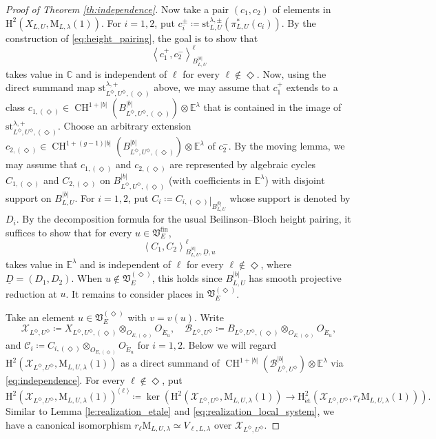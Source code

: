 \documentclass[12pt]{amsart}
\numberwithin{equation}{section}
\theoremstyle{plain}
\theoremstyle{definition}
\theoremstyle{remark}
\renewcommand{\c}[1]{\mathcal{#1}}
\renewcommand{\d}[1]{\mathbb{#1}}
\newcommand{\f}[1]{\mathfrak{#1}}
\renewcommand{\r}[1]{\mathrm{#1}}
\renewcommand{\(}{\left(}
\renewcommand{\)}{\right)}
\newcommand{\res}{\mathbin{|}}
\newcommand{\ang}[1]{\langle{#1}\rangle}
\newcommand{\ul}{\underline}
\newcommand{\cB}{\c B}
\newcommand{\cC}{\c C}
\newcommand{\cX}{\c X}
\newcommand{\dC}{\d C}
\newcommand{\dE}{\d E}
\newcommand{\fV}{\f V}
\newcommand{\rH}{\r H}
\newcommand{\rM}{\r M}
\newcommand{\llangle}{\left\langle}
\newcommand{\rrangle}{\right\rangle}
\newcommand{\et}{{\acute{\r{e}}\r{t}}}
\newcommand{\fin}{\r{fin}}
\newcommand{\st}{\r{st}}
\DeclareMathOperator{\CH}{CH}
\DeclareMathOperator{\Ker}{ker}
\begin{document}
\begin{proof}[Proof of Theorem \ref{th:independence}]
Now take a pair $(c_1,c_2)$ of elements in $\rH^2(X_{L,U},\rM_{L,\lambda}(1))$. For $i=1,2$, put $c_i^\pm\coloneqq\st_{L,U}^{\lambda,\pm}(\pi_{L,U}^*(c_i))$. By the construction of \eqref{eq:height_pairing}, the goal is to show that
\[
\llangle c_1^+,c_2^-\rrangle_{B_{L,U}^{|b|}}^\ell
\]
takes value in $\dC$ and is independent of $\ell$ for every $\ell\not\in\Diamond$. Now, using the direct summand map $\st_{L^\Diamond,U^\Diamond,(\Diamond)}^{\lambda,+}$ above, we may assume that $c_1^+$ extends to a class $c_{1,(\Diamond)}\in\CH^{1+|b|}(B_{L^\Diamond,U^\Diamond,(\Diamond)}^{|b|})\otimes\dE^\lambda$ that is contained in the image of $\st_{L^\Diamond,U^\Diamond,(\Diamond)}^{\lambda,+}$. Choose an arbitrary extension $c_{2,(\Diamond)}\in\CH^{1+(g-1)|b|}(B_{L^\Diamond,U^\Diamond,(\Diamond)}^{|b|})\otimes\dE^\lambda$ of $c_2^-$. By the moving lemma, we may assume that $c_{1,(\Diamond)}$ and $c_{2,(\Diamond)}$ are represented by algebraic cycles $C_{1,(\Diamond)}$ and $C_{2,(\Diamond)}$ on $B_{L^\Diamond,U^\Diamond,(\Diamond)}^{|b|}$ (with coefficients in $\dE^\lambda$) with disjoint support on $B_{L,U}^{|b|}$. For $i=1,2$, put $C_i\coloneqq C_{i,(\Diamond)}\res_{B_{L,U}^{|b|}}$ whose support is denoted by $D_i$. By the decomposition formula for the usual Beilinson--Bloch height pairing, it suffices to show that for every $u\in\fV_E^\fin$,
\[
\llangle C_1,C_2\rrangle_{B_{L,U}^{|b|},\ul{D},u}^\ell
\]
takes value in $\dE^\lambda$ and is independent of $\ell$ for every $\ell\not\in\Diamond$, where $\ul{D}=(D_1,D_2)$. When $u\not\in\fV_E^{(\Diamond)}$, this holds since $B_{L,U}^{|b|}$ has smooth projective reduction at $u$. It remains to consider places in $\fV_E^{(\Diamond)}$.

Take an element $u\in\fV_E^{(\Diamond)}$ with $v=v(u)$. Write
\[
\cX_{L^\Diamond,U^\Diamond}\coloneqq X_{L^\Diamond,U^\Diamond,(\Diamond)}\otimes_{O_{E,(\Diamond)}}O_{\breve{E}_u},\quad
\cB_{L^\Diamond,U^\Diamond}\coloneqq B_{L^\Diamond,U^\Diamond,(\Diamond)}\otimes_{O_{E,(\Diamond)}}O_{\breve{E}_u},
\]
and $\cC_i\coloneqq C_{i,(\Diamond)}\otimes_{O_{E,(\Diamond)}}O_{\breve{E}_u}$ for $i=1,2$. Below we will regard $\rH^2(\cX_{L^\Diamond,U^\Diamond},\rM_{L,U,\lambda}(1))$ as a direct summand of $\CH^{1+|b|}(\cB_{L^\Diamond,U^\Diamond}^{|b|})\otimes\dE^\lambda$ via \eqref{eq:independence}. For every $\ell\not\in\Diamond$, put
\[
\rH^2(\cX_{L^\Diamond,U^\Diamond},\rM_{L,U,\lambda}(1))^{\ang{\ell}}\coloneqq
\Ker\(\rH^2(\cX_{L^\Diamond,U^\Diamond},\rM_{L,U,\lambda}(1))
\to\rH^2_{\et}(\cX_{L^\Diamond,U^\Diamond},r_\ell\rM_{L,U,\lambda}(1))\).
\]
Similar to Lemma \ref{le:realization_etale} and \eqref{eq:realization_local_system}, we have a canonical isomorphism $r_\ell\rM_{L,U,\lambda}\simeq V_{\ell,L,\lambda}$ over $\cX_{L^\Diamond,U^\Diamond}$.


\end{proof}
\end{document}
